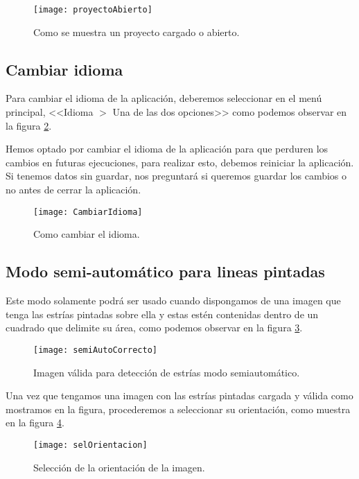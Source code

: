 \begin{figure}[h]
\centering
\texttt{[image: proyectoAbierto]}
\caption{Como se muestra un proyecto cargado o abierto.}
\label{fig:proyectoAbierto}
\end{figure}

\subsection{Cambiar idioma}
\label{modo:idioma}

Para cambiar el idioma de la aplicación, deberemos seleccionar en el menú principal, <<Idioma $>$ Una de las dos opciones>> como podemos observar en la figura \ref{fig:camb}.

Hemos optado por cambiar el idioma de la aplicación para que perduren los cambios en futuras ejecuciones, para realizar esto, debemos reiniciar la aplicación. Si tenemos datos sin guardar, nos preguntará si queremos guardar los cambios o no antes de cerrar la aplicación.

\begin{figure}[h]
\centering
\texttt{[image: CambiarIdioma]}
\caption{Como cambiar el idioma.}
\label{fig:camb}
\end{figure}

\subsection{Modo semi-automático para lineas pintadas}

Este modo solamente podrá ser usado cuando dispongamos de una imagen que tenga las estrías pintadas sobre ella y estas estén contenidas dentro de un cuadrado que delimite su área, como podemos observar en la figura \ref{fig:semiAutoCorrecto}.



\begin{figure}[h]
\centering
\texttt{[image: semiAutoCorrecto]}
\caption{Imagen válida para detección de estrías modo semiautomático.}
\label{fig:semiAutoCorrecto}
\end{figure}

Una vez que tengamos una imagen con las estrías pintadas cargada y válida como mostramos en la figura, procederemos a seleccionar su orientación, como muestra en la figura \ref{fig:selOrientacion}.

\begin{figure}[h]
\centering
\texttt{[image: selOrientacion]}
\caption{Selección de la orientación de la imagen.}
\label{fig:selOrientacion}
\end{figure}

